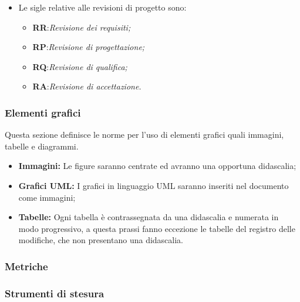 \begin{itemize}
	\item Le sigle relative alle revisioni di progetto sono:
	
	\begin{itemize}
	
		\item \textbf{RR}:\textit{Revisione dei requisiti;} 	
		
		\item \textbf{RP}:\textit{Revisione di progettazione;} 
		
		\item \textbf{RQ}:\textit{Revisione di qualifica;} 
		
		\item \textbf{RA}:\textit{Revisione di accettazione.} 
	
	\end{itemize}
	
\end{itemize}

\subsubsection{Elementi grafici}

Questa sezione definisce le norme per l'uso di elementi grafici quali immagini, tabelle e diagrammi.

\begin{itemize}

\item \textbf{Immagini:} Le figure saranno centrate ed avranno una opportuna didascalia;

\item \textbf{Grafici UML:} I grafici in linguaggio UML saranno inseriti nel documento come immagini;

\item \textbf{Tabelle:} Ogni tabella è contrassegnata da una didascalia e numerata in modo progressivo, a questa prassi fanno eccezione le tabelle del registro delle modifiche, che non presentano una didascalia.


\end{itemize}

\subsubsection{Metriche}

\subsubsection{Strumenti di stesura}

